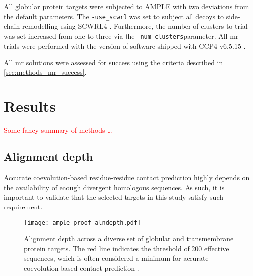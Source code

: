 All globular protein targets were subjected to AMPLE with two deviations from the default parameters. The \texttt{-use\_scwrl} was set to subject all decoys to side-chain remodelling using SCWRL4 \cite{Krivov2009-ex}. Furthermore, the number of clusters to trial was set increased from one to three via the \texttt{-num\_clusters}parameter. All \gls{mr} trials were performed with the version of software shipped with CCP4 v6.5.15 \cite{Winn2011-xe}.

All \gls{mr} solutions were assessed for success using the criteria described in \cref{sec:methods_mr_success}.

\section{Results}
\textcolor{red}{Some fancy summary of methods \ldots}

\subsection{Alignment depth}
Accurate coevolution-based residue-residue contact prediction highly depends on the availability of enough divergent homologous sequences. As such, it is important to validate that the selected targets in this study satisfy such requirement.

\begin{figure}[H]
    \centering
    \texttt{[image: ample\_proof\_alndepth.pdf]}
    \caption{Alignment depth across a diverse set of globular and transmembrane protein targets. The red line indicates the threshold of 200 effective sequences, which is often considered a minimum for accurate coevolution-based contact prediction \cite{Simkovic2016-wk}.}
    \label{fig:ample_proof_alndepth}
\end{figure}

